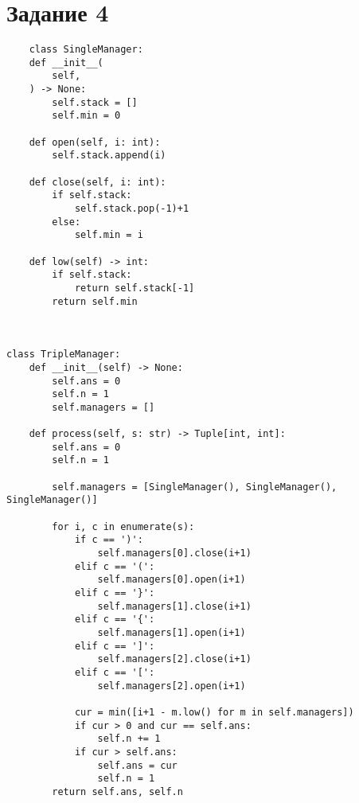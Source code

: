 
\section*{Задание 4}


\begin{lstlisting}
	class SingleManager:
    def __init__(
        self,
    ) -> None:
        self.stack = []
        self.min = 0

    def open(self, i: int):
        self.stack.append(i)

    def close(self, i: int):
        if self.stack:
            self.stack.pop(-1)+1
        else:
            self.min = i

    def low(self) -> int:
        if self.stack:
            return self.stack[-1]
        return self.min



class TripleManager:
    def __init__(self) -> None:
        self.ans = 0
        self.n = 1
        self.managers = []

    def process(self, s: str) -> Tuple[int, int]:
        self.ans = 0
        self.n = 1

        self.managers = [SingleManager(), SingleManager(), SingleManager()]

        for i, c in enumerate(s):
            if c == ')':
                self.managers[0].close(i+1)
            elif c == '(':
                self.managers[0].open(i+1)
            elif c == '}':
                self.managers[1].close(i+1)
            elif c == '{':
                self.managers[1].open(i+1)
            elif c == ']':
                self.managers[2].close(i+1)
            elif c == '[':
                self.managers[2].open(i+1)

            cur = min([i+1 - m.low() for m in self.managers])
            if cur > 0 and cur == self.ans:
                self.n += 1
            if cur > self.ans:
                self.ans = cur
                self.n = 1
        return self.ans, self.n
\end{lstlisting}

